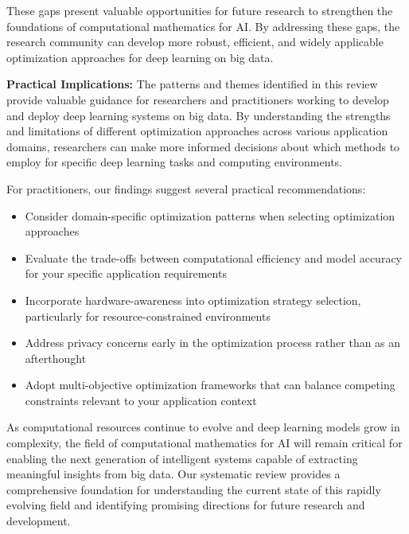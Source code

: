 \documentclass[acmsmall]{acmart}
\begin{document}
These gaps present valuable opportunities for future research to strengthen the foundations of computational mathematics for AI. By addressing these gaps, the research community can develop more robust, efficient, and widely applicable optimization approaches for deep learning on big data.

\textbf{Practical Implications:} The patterns and themes identified in this review provide valuable guidance for researchers and practitioners working to develop and deploy deep learning systems on big data. By understanding the strengths and limitations of different optimization approaches across various application domains, researchers can make more informed decisions about which methods to employ for specific deep learning tasks and computing environments.

For practitioners, our findings suggest several practical recommendations:
\begin{itemize}
    \item Consider domain-specific optimization patterns when selecting optimization approaches
    \item Evaluate the trade-offs between computational efficiency and model accuracy for your specific application requirements
    \item Incorporate hardware-awareness into optimization strategy selection, particularly for resource-constrained environments
    \item Address privacy concerns early in the optimization process rather than as an afterthought
    \item Adopt multi-objective optimization frameworks that can balance competing constraints relevant to your application context
\end{itemize}

As computational resources continue to evolve and deep learning models grow in complexity, the field of computational mathematics for AI will remain critical for enabling the next generation of intelligent systems capable of extracting meaningful insights from big data. Our systematic review provides a comprehensive foundation for understanding the current state of this rapidly evolving field and identifying promising directions for future research and development.


\end{document}
